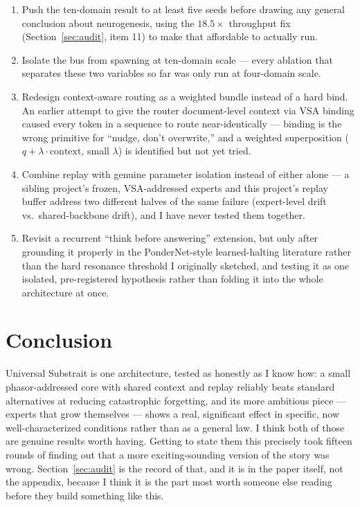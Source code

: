 \documentclass[11pt,letterpaper]{article}
\begin{document}
\begin{enumerate}[leftmargin=1.6em]
\item Push the ten-domain result to at least five seeds before drawing any general conclusion about neurogenesis, using the $18.5\times$ throughput fix (Section~\ref{sec:audit}, item 11) to make that affordable to actually run.
\item Isolate the bus from spawning at ten-domain scale --- every ablation that separates these two variables so far was only run at four-domain scale.
\item Redesign context-aware routing as a weighted bundle instead of a hard bind. An earlier attempt to give the router document-level context via VSA binding caused every token in a sequence to route near-identically --- binding is the wrong primitive for ``nudge, don't overwrite,'' and a weighted superposition ($q + \lambda \cdot \text{context}$, small $\lambda$) is identified but not yet tried.
\item Combine replay with genuine parameter isolation instead of either alone --- a sibling project's frozen, VSA-addressed experts and this project's replay buffer address two different halves of the same failure (expert-level drift vs.\ shared-backbone drift), and I have never tested them together.
\item Revisit a recurrent ``think before answering'' extension, but only after grounding it properly in the PonderNet-style learned-halting literature rather than the hard resonance threshold I originally sketched, and testing it as one isolated, pre-registered hypothesis rather than folding it into the whole architecture at once.
\end{enumerate}

\section{Conclusion}

Universal Substrait is one architecture, tested as honestly as I know how: a small phasor-addressed core with shared context and replay reliably beats standard alternatives at reducing catastrophic forgetting, and its more ambitious piece --- experts that grow themselves --- shows a real, significant effect in specific, now well-characterized conditions rather than as a general law. I think both of those are genuine results worth having. Getting to state them this precisely took fifteen rounds of finding out that a more exciting-sounding version of the story was wrong. Section~\ref{sec:audit} is the record of that, and it is in the paper itself, not the appendix, because I think it is the part most worth someone else reading before they build something like this.
\end{document}
